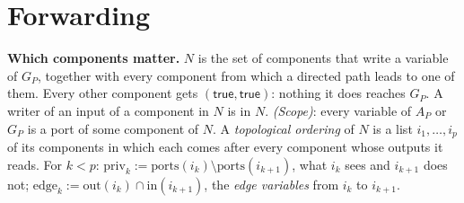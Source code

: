 \documentclass[10pt]{article}
\theoremstyle{tplain}\newtheorem{theorem}{Theorem}\newtheorem{lemma}[theorem]{Lemma}\newtheorem{proposition}[theorem]{Proposition}\newtheorem{corollary}[theorem]{Corollary}
\theoremstyle{tdef}\newtheorem{definition}[theorem]{Definition}
\newcommand{\inp}{\mathrm{in}}\newcommand{\outp}{\mathrm{out}}\newcommand{\ports}{\mathrm{ports}}
\newcommand{\priv}{\mathrm{priv}}\newcommand{\edge}{\mathrm{edge}}
\newcommand{\TRUE}{\mathsf{true}}\newcommand{\FALSE}{\mathsf{false}}
\begin{document}
\section{Forwarding}\label{sec:fwd}
\textbf{Which components matter.} $N$ is the set of components that write a variable of $G_P$, together with every component from which a directed path leads to one of them. Every other component gets $(\TRUE,\TRUE)$: nothing it does reaches $G_P$. A writer of an input of a component in $N$ is in $N$. \emph{(Scope)}: every variable of $A_P$ or $G_P$ is a port of some component of $N$. A \emph{topological ordering} of $N$ is a list $i_1,\dots,i_p$ of its components in which each comes after every component whose outputs it reads. For $k<p$: $\priv_k:=\ports(i_k)\setminus\ports(i_{k+1})$, what $i_k$ sees and $i_{k+1}$ does not; $\edge_k:=\outp(i_k)\cap\inp(i_{k+1})$, the \emph{edge variables} from $i_k$ to $i_{k+1}$.
\end{document}
